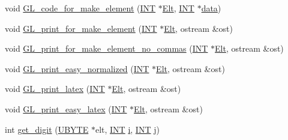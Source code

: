 \begin{DoxyCompactItemize}
\item 
void \mbox{\hyperlink{classmatrix__group_ab7e784e8a49778919a83c9db94906180}{G\+L\+\_\+code\+\_\+for\+\_\+make\+\_\+element}} (\mbox{\hyperlink{galois_8h_a09fddde158a3a20bd2dcadb609de11dc}{I\+NT}} $\ast$\mbox{\hyperlink{simeon_8_c_aec1406935bdb1fee3561fcb840964100}{Elt}}, \mbox{\hyperlink{galois_8h_a09fddde158a3a20bd2dcadb609de11dc}{I\+NT}} $\ast$\mbox{\hyperlink{classmatrix__group_ac407c02992cbcfc2f8494dad8b4bfe20}{data}})
\item 
void \mbox{\hyperlink{classmatrix__group_a4bf6a23bf9e16f8696e7799dd3470ea2}{G\+L\+\_\+print\+\_\+for\+\_\+make\+\_\+element}} (\mbox{\hyperlink{galois_8h_a09fddde158a3a20bd2dcadb609de11dc}{I\+NT}} $\ast$\mbox{\hyperlink{simeon_8_c_aec1406935bdb1fee3561fcb840964100}{Elt}}, ostream \&ost)
\item 
void \mbox{\hyperlink{classmatrix__group_a4355ec5c4f85037545af99c42bc49794}{G\+L\+\_\+print\+\_\+for\+\_\+make\+\_\+element\+\_\+no\+\_\+commas}} (\mbox{\hyperlink{galois_8h_a09fddde158a3a20bd2dcadb609de11dc}{I\+NT}} $\ast$\mbox{\hyperlink{simeon_8_c_aec1406935bdb1fee3561fcb840964100}{Elt}}, ostream \&ost)
\item 
void \mbox{\hyperlink{classmatrix__group_a4e43d5508d6c7a85e44fd7bd3b52194b}{G\+L\+\_\+print\+\_\+easy\+\_\+normalized}} (\mbox{\hyperlink{galois_8h_a09fddde158a3a20bd2dcadb609de11dc}{I\+NT}} $\ast$\mbox{\hyperlink{simeon_8_c_aec1406935bdb1fee3561fcb840964100}{Elt}}, ostream \&ost)
\item 
void \mbox{\hyperlink{classmatrix__group_a3dee033516b0e1688aefe95a483d9d76}{G\+L\+\_\+print\+\_\+latex}} (\mbox{\hyperlink{galois_8h_a09fddde158a3a20bd2dcadb609de11dc}{I\+NT}} $\ast$\mbox{\hyperlink{simeon_8_c_aec1406935bdb1fee3561fcb840964100}{Elt}}, ostream \&ost)
\item 
void \mbox{\hyperlink{classmatrix__group_a45a042521f1f125b241c78c1388b078c}{G\+L\+\_\+print\+\_\+easy\+\_\+latex}} (\mbox{\hyperlink{galois_8h_a09fddde158a3a20bd2dcadb609de11dc}{I\+NT}} $\ast$\mbox{\hyperlink{simeon_8_c_aec1406935bdb1fee3561fcb840964100}{Elt}}, ostream \&ost)
\item 
int \mbox{\hyperlink{classmatrix__group_ab73d77695beeb972d573910eae4014a8}{get\+\_\+digit}} (\mbox{\hyperlink{galois_8h_a122c4acf389c050379f00341fdcd5812}{U\+B\+Y\+TE}} $\ast$elt, \mbox{\hyperlink{galois_8h_a09fddde158a3a20bd2dcadb609de11dc}{I\+NT}} \mbox{\hyperlink{alphabet2_8_c_acb559820d9ca11295b4500f179ef6392}{i}}, \mbox{\hyperlink{galois_8h_a09fddde158a3a20bd2dcadb609de11dc}{I\+NT}} \mbox{\hyperlink{alphabet2_8_c_a37d972ae0b47b9099e30983131d31916}{j}})

\end{DoxyCompactItemize}
